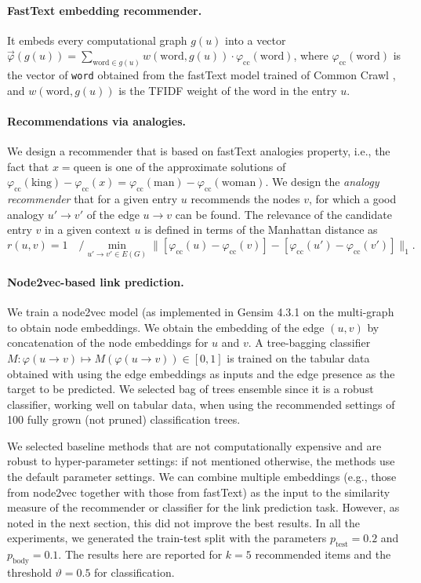 \documentclass{article}
\begin{document}
\paragraph{FastText embedding recommender.} It embeds every computational graph $g(u)$ into a vector $\vec{\varphi}(g(u)) =
        \sum_{\text{word}\in g(u)}
            w(\text{word}, g(u)) \cdot \varphi_\text{cc}(\text{word})$,
where $\varphi_\text{cc}(\text{word})$ is the vector of \texttt{word} obtained from the fastText model trained of Common Crawl \citep{fastText2018}, and $w(\text{word}, g(u))$ is the TFIDF weight of the word in the entry $u$.

\paragraph{Recommendations via analogies.} We design a recommender that is based on fastText analogies property, i.e., the fact that $x = \text{queen}$ is one of the approximate solutions of
    $\varphi_\text{cc}(\text{king}) - \varphi_\text{cc}(x) = \varphi_\text{cc}(\text{man}) - \varphi_\text{cc}(\text{woman})$.
We design the \emph{analogy recommender} that for a given entry $u$ recommends the nodes $v$, for which a good analogy $u'\to v'$ of the edge $u\to v$ can be found. The relevance of the candidate entry $v$ in a given context $u$ is defined in terms of the Manhattan distance as
$$
    r(u, v) = 1\quad / \min_{u'\to v'\in E(G)} \| [\varphi_\text{cc}(u) - \varphi_\text{cc}(v)] - [\varphi_\text{cc}(u') -  \varphi_\text{cc}(v')] \|_1.
$$

\paragraph{Node2vec-based link prediction.} We train a node2vec \citep{node2vec} model (as implemented in Gensim 4.3.1 \citep{rehurek2011gensim} on the multi-graph to obtain node embeddings. We obtain the embedding of the edge $(u, v)$ by concatenation of the node embeddings for $u$ and $v$. A tree-bagging classifier $M: \varphi(u\to v)\mapsto M(\varphi(u\to v))\in [0, 1]$ is trained on the tabular data obtained with using the edge embeddings as inputs and the edge presence as the target to be predicted. We selected bag of trees ensemble since it is a robust classifier, working well on tabular data, when using the recommended settings of 100 fully grown (not pruned) classification trees.

We selected baseline methods that are not computationally expensive and are robust to hyper-parameter settings: if not mentioned otherwise, the methods use the default parameter settings. We can combine multiple embeddings (e.g., those from node2vec together with those from fastText) as the input to the similarity measure of the recommender or classifier for the link prediction task. However, as noted in the next section, this did not improve the best results. In all the experiments, we generated the train-test split with the parameters $p_\text{test} = 0.2$ and $p_\text{body} = 0.1$. The results here are reported for $k = 5$ recommended items and the threshold $\vartheta = 0.5$ for classification.
\end{document}
